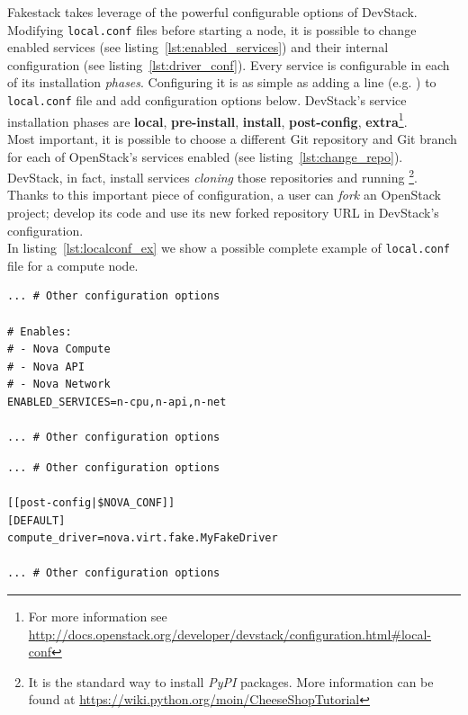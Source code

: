 Fakestack takes leverage of the powerful configurable options of DevStack. Modifying \texttt{local.conf} files before starting a node, it is possible to change enabled services (see listing~\ref{lst:enabled_services}) and their internal configuration (see listing~\ref{lst:driver_conf}). Every service is configurable in each of its installation \textit{phases}. Configuring it is as simple as adding a  line (e.g. ) to \texttt{local.conf} file and add configuration options below. DevStack's service installation phases are \textbf{local}, \textbf{pre-install}, \textbf{install}, \textbf{post-config}, \textbf{extra}\footnote{For more information see \url{http://docs.openstack.org/developer/devstack/configuration.html\#local-conf}}.\\
Most important, it is possible to choose a different Git repository and Git branch for each of OpenStack's services enabled (see listing~\ref{lst:change_repo}). DevStack, in fact, install services \textit{cloning} those repositories and running \footnote{\label{note:pypi}It is the standard way to install \textit{PyPI} packages. More information can be found at \url{https://wiki.python.org/moin/CheeseShopTutorial}}.\\
Thanks to this important piece of configuration, a user can \textit{fork} an OpenStack project; develop its code and use its new forked repository URL in DevStack's configuration.\\
In listing~\ref{lst:localconf_ex} we show a possible complete example of \texttt{local.conf} file for a compute node.

\begin{lstlisting}[floatplacement=H, caption={Choose OpenStack's enabled services}, label={lst:enabled_services}, numbers=none]
... # Other configuration options

# Enables:
# - Nova Compute
# - Nova API
# - Nova Network
ENABLED_SERVICES=n-cpu,n-api,n-net

... # Other configuration options
\end{lstlisting}

\begin{lstlisting}[floatplacement=H, caption={Internal configuration of Nova}, label={lst:driver_conf}, numbers=none]
... # Other configuration options

[[post-config|$NOVA_CONF]]
[DEFAULT]
compute_driver=nova.virt.fake.MyFakeDriver

... # Other configuration options
\end{lstlisting}

